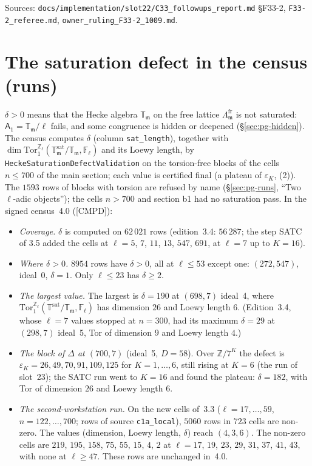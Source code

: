 \documentclass[11pt]{article}
\newcommand{\Z}{\mathbb{Z}}
\newcommand{\Fl}{\mathbb{F}_\ell}
\newcommand{\Zl}{\mathbb{Z}_\ell}
\newcommand{\T}{\mathbb{T}}
\newcommand{\m}{\mathfrak{m}}
\newcommand{\code}[1]{\texttt{#1}}
\newcommand{\pfile}[1]{\nolinkurl{#1}}
\newcommand{\CMPD}{\textsf{\small[CMPD]}}
\begin{document}
\noindent Sources: \pfile{docs/implementation/slot22/C33_followups_report.md} \S F33-2, \pfile{F33-2_referee.md}, \pfile{owner_ruling_F33-2_1009.md}.

\section{The saturation defect in the census (runs)}\label{sec:pg-satdef}

$\delta>0$ means that the Hecke algebra $\T_\m$ on the free lattice $\Lambda^{\mathrm{fr}}_\m$ is not saturated: $\mathsf A_1=\T_\m/\ell$ fails,
and some congruence is hidden or deepened (\S\ref{sec:pg-hidden}). The census computes $\delta$ (column \code{sat\_length}), together with
$\dim\mathrm{Tor}_1^{\Zl}(\T^{\mathrm{sat}}_\m/\T_\m,\Fl)$ and its Loewy length, by \code{HeckeSaturationDefectValidation} on the torsion-free
blocks of the cells $n\le700$ of the main section; each value is certified final (a plateau of $\varepsilon_K$, {}(2)).
The $1593$ rows of blocks with torsion are refused by name (\S\ref{sec:pg-runs}, ``Two $\ell$-adic objects''); the cells $n>700$ and section b1
had no saturation pass. In the signed census~4.0 (\CMPD):
\begin{itemize}[leftmargin=1.6em,itemsep=1pt]
\item \emph{Coverage.} $\delta$ is computed on $62\,021$ rows (edition~3.4: $56\,287$; the step SATC of 3.5 added the cells at $\ell=5$, $7$,
  $11$, $13$, $547$, $691$, at $\ell=7$ up to $K=16$).
\item \emph{Where $\delta>0$.} $8954$ rows have $\delta>0$, all at $\ell\le53$ except one: $(272,547)$, ideal~$0$, $\delta=1$. Only $\ell\le23$
  has $\delta\ge2$.
\item \emph{The largest value.} The largest is $\delta=190$ at $(698,7)$ ideal~4, where $\mathrm{Tor}_1^{\Zl}(\T^{\mathrm{sat}}/\T_\m,\Fl)$
  has dimension $26$ and Loewy length $6$. (Edition~3.4, whose $\ell=7$ values stopped at $n=300$, had its maximum $\delta=29$ at $(298,7)$
  ideal~5, Tor of dimension $9$ and Loewy length $4$.)
\item \emph{The block of $\Delta$ at $(700,7)$} (ideal~5, $D=58$). Over $\Z/7^{K}$ the defect is $\varepsilon_K=26,49,70,91,109,125$ for
  $K=1,\dots,6$, still rising at $K=6$ (the run of slot~23); the SATC run went to $K=16$ and found the plateau: $\delta=182$, with Tor of
  dimension $26$ and Loewy length $6$.
\item \emph{The second-workstation run.} On the new cells of~3.3 ($\ell=17,\dots,59$, $n=122,\dots,700$; rows of source \code{c1a\_local}), $5060$ rows in
  $723$ cells are non-zero. The values (dimension, Loewy length, $\delta$) reach $(4,3,6)$. The non-zero cells are $219$, $195$, $158$, $75$,
  $55$, $15$, $4$, $2$ at $\ell=17$, $19$, $23$, $29$, $31$, $37$, $41$, $43$, with none at $\ell\ge47$. These rows are unchanged in~4.0.
\end{itemize}
\end{document}
